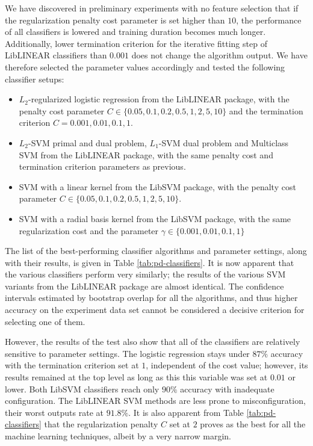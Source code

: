 \documentclass[12pt,notitlepage]{report}
\begin{document}
We have discovered in preliminary experiments with no feature selection that if the regularization penalty cost parameter is set higher than $10$, the performance of all classifiers is lowered and training duration becomes much longer. Additionally, lower termination criterion for the iterative fitting step of LibLINEAR classifiers than $0.001$ does not change the algorithm output. We have therefore selected the parameter values accordingly and tested the following classifier setups:
\begin{itemize}
    \item $L_2$-regularized logistic regression from the LibLINEAR package, with the penalty cost parameter $C\in\{0.05,0.1,0.2,0.5,1,2,5,10\}$ and the termination criterion $C=0.001, 0.01, 0.1, 1$.
    \item $L_2$-SVM primal and dual problem, $L_1$-SVM dual problem and Multiclass SVM from the LibLINEAR package, with the same penalty cost and termination criterion parameters as previous.
    \item SVM with a linear kernel from the LibSVM package, with the penalty cost parameter $C\in\{0.05,0.1,0.2,0.5,1,2,5,10\}$.
    \item SVM with a radial basis kernel from the LibSVM package, with the same regularization cost and the parameter $\gamma\in\{0.001,0.01,0.1,1\}$ 
\end{itemize}
The list of the best-performing classifier algorithms and parameter settings, along with their results, is given in Table \ref{tab:pd-classifiers}. It is now apparent that the various classifiers perform very similarly; the results of the various SVM variants from the LibLINEAR package are almost identical. The confidence intervals estimated by bootstrap overlap for all the algorithms, and thus higher accuracy on the experiment data set cannot be considered a decisive criterion for selecting one of them. 

However, the results of the test also show that all of the classifiers are relatively sensitive to parameter settings. The logistic regression stays under $87\%$ accuracy with the termination criterion set at $1$, independent of the cost value; however, its results remained at the top level as long as this this variable was set at $0.01$ or lower. Both LibSVM classifiers reach only $90\%$ accuracy with inadequate configuration. The LibLINEAR SVM methods are less prone to misconfiguration, their worst outputs rate at $91.8\%$. It is also apparent from Table \ref{tab:pd-classifiers} that the regularization penalty $C$ set at $2$ proves as the best for all the machine learning techniques, albeit by a very narrow margin.
\end{document}
